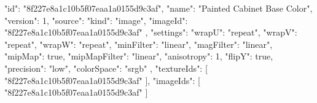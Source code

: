 {
  "id": "8f227e8a1c10b5f07eaa1a0155d9c3af",
  "name": "Painted Cabinet Base Color",
  "version": 1,
  "source": {
    "kind": "image",
    "imageId": "8f227e8a1c10b5f07eaa1a0155d9c3af"
  },
  "settings": {
    "wrapU": "repeat",
    "wrapV": "repeat",
    "wrapW": "repeat",
    "minFilter": "linear",
    "magFilter": "linear",
    "mipMap": true,
    "mipMapFilter": "linear",
    "anisotropy": 1,
    "flipY": true,
    "precision": "low",
    "colorSpace": "srgb"
  },
  "textureIds": [
    "8f227e8a1c10b5f07eaa1a0155d9c3af"
  ],
  "imageIds": [
    "8f227e8a1c10b5f07eaa1a0155d9c3af"
  ]
}
